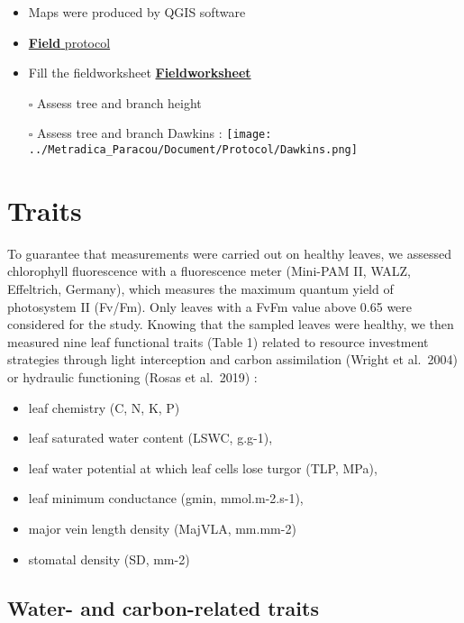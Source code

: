 \documentclass[
]{book}
\providecommand{\tightlist}{%
  \setlength{\itemsep}{0pt}\setlength{\parskip}{0pt}}
\begin{document}
\begin{itemize}
\tightlist
\item
  Maps were produced by QGIS software
\item
  \href{../Metradica_Paracou/Document/Protocol/Field.Rmd}{\textbf{Field} protocol}
\item
  Fill the fieldworksheet \href{../Metradica_Paracou/Document/Protocol/Feuille_terrain_releve.xlsx}{\textbf{Fieldworksheet}}
\item[$\square$]
  Assess tree and branch height
\item[$\square$]
  Assess tree and branch Dawkins : \texttt{[image: ../Metradica\_Paracou/Document/Protocol/Dawkins.png]}
\end{itemize}

\hypertarget{traits}{%
\chapter{Traits}\label{traits}}

To guarantee that measurements were carried out on healthy leaves, we assessed chlorophyll fluorescence with a fluorescence meter (Mini-PAM II, WALZ, Effeltrich, Germany), which measures the maximum quantum yield of photosystem II (Fv/Fm). Only leaves with a FvFm value above 0.65 were considered for the study. Knowing that the sampled leaves were healthy, we then measured nine leaf functional traits (Table 1) related to resource investment strategies through light interception and carbon assimilation (Wright et al.~2004) or hydraulic functioning (Rosas et al.~2019) :

\begin{itemize}
\tightlist
\item
  leaf chemistry (C, N, K, P)
\item
  leaf saturated water content (LSWC, g.g-1),
\item
  leaf water potential at which leaf cells lose turgor (TLP, MPa),
\item
  leaf minimum conductance (gmin, mmol.m-2.s-1),
\item
  major vein length density (MajVLA, mm.mm-2)
\item
  stomatal density (SD, mm-2)
\end{itemize}

\hypertarget{water--and-carbon-related-traits}{%
\section{Water- and carbon-related traits}\label{water--and-carbon-related-traits}}
\end{document}
